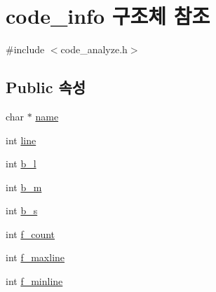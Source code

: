 \hypertarget{structcode__info}{\section{code\+\_\+info 구조체 참조}
\label{structcode__info}
}


{\ttfamily \#include $<$code\+\_\+analyze.\+h$>$}

\subsection*{Public 속성}
\begin{DoxyCompactItemize}
\item 
char $\ast$ \hyperlink{structcode__info_ab511aa50afcbcfc1bb2fa4b4a6012e6b}{name}
\item 
int \hyperlink{structcode__info_ad2648840a6e7ba7c9c02ec444a3adac2}{line}
\item 
int \hyperlink{structcode__info_a06f6c405ef67eb10711dc4fbc90e52c2}{b\+\_\+l}
\item 
int \hyperlink{structcode__info_a4dc2ea78ef6f9f8f1fea89fd42f7bf18}{b\+\_\+m}
\item 
int \hyperlink{structcode__info_a881e5abdce42a2de03dd079ee7ae3304}{b\+\_\+s}
\item 
int \hyperlink{structcode__info_a091007c87af472a025bc06633218e344}{f\+\_\+count}
\item 
int \hyperlink{structcode__info_a8a9fc76d0701714e834a52a66b82156e}{f\+\_\+maxline}
\item 
int \hyperlink{structcode__info_ac0a3b579d41a998a2aec410925032aa7}{f\+\_\+minline}
\end{DoxyCompactItemize}


